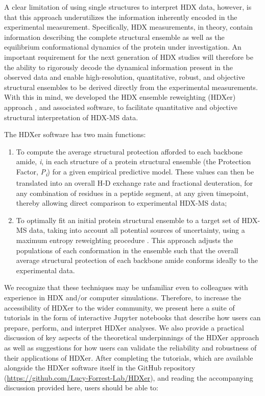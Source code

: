 \documentclass[9pt,tutorial,ASAPversion]{livecoms}
\begin{document}
A clear limitation of using single structures to interpret HDX data, however, is that this approach underutilizes the information inherently encoded in the experimental measurement.
Specifically, HDX measurements, in theory, contain information describing the complete structural ensemble as well as the equilibrium conformational dynamics of the protein under investigation.
An important requirement for the next generation of HDX studies will therefore be the ability to rigorously decode the dynamical information present in the observed data and enable high-resolution, quantitative, robust, and objective structural ensembles to be derived directly from the experimental measurements.
With this in mind, we developed the HDX ensemble reweighting (HDXer) approach \cite{Bradshaw2020}, and associated software, to facilitate quantitative and objective structural interpretation of HDX-MS data.

The HDXer software has two main functions:

\begin{enumerate}
\item To compute the average structural protection afforded to each backbone amide, \textit{i}, in each structure of a protein structural ensemble (the Protection Factor, \textit{P\textsubscript{i}}) for a given empirical predictive model. These values can then be translated into an overall H-D exchange rate and fractional deuteration, for any combination of residues in a peptide segment, at any given timepoint, thereby allowing direct comparison to experimental HDX-MS data;

\item To optimally fit an initial protein structural ensemble to a target set of HDX-MS data, taking into account all potential sources of uncertainty, using a maximum entropy reweighting procedure \cite{Pitera2012, Boomsma2014, Marinelli2019}. This approach adjusts the populations of each conformation in the ensemble such that the overall average structural protection of each backbone amide conforms ideally to the experimental data.
\end{enumerate}

We recognize that these techniques may be unfamiliar even to colleagues with experience in HDX and/or computer simulations. 
Therefore, to increase the accessibility of HDXer to the wider community, we present here a suite of tutorials in the form of interactive Jupyter notebooks that describe how users can prepare, perform, and interpret HDXer analyses. 
We also provide a practical discussion of key aspects of the theoretical underpinnings of the HDXer approach as well as suggestions for how users can validate the reliability and robustness of their applications of HDXer.
After completing the tutorials, which are available alongside the HDXer software itself in the GitHub repository (\url{https://github.com/Lucy-Forrest-Lab/HDXer}), and reading the accompanying discussion provided here, users should be able to:
\end{document}

